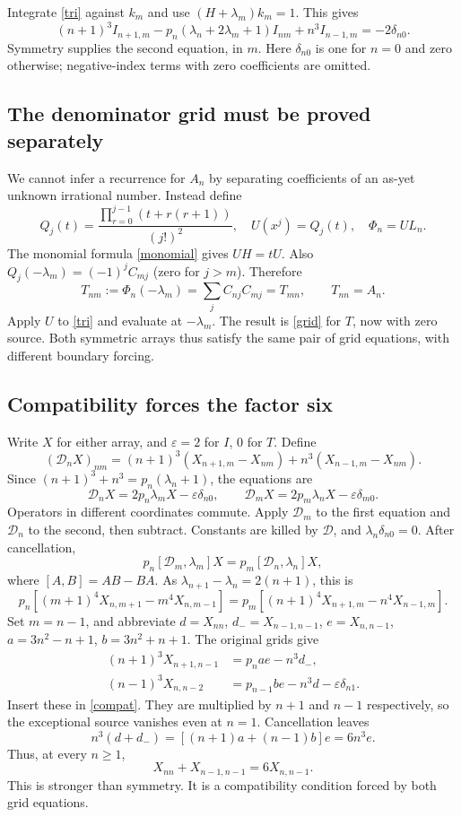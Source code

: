 \documentclass[11pt]{article}
\begin{document}
Integrate \eqref{tri} against $k_m$ and use $(H+\lambda_m)k_m=1$. This gives
\begin{equation}\label{grid}
 (n+1)^3I_{n+1,m}-p_n(\lambda_n+2\lambda_m+1)I_{nm}
       +n^3I_{n-1,m}=-2\delta_{n0}.
\end{equation}
Symmetry supplies the second equation, in $m$. Here $\delta_{n0}$ is one for $n=0$ and zero otherwise; negative-index terms with zero coefficients are omitted.

\subsection{The denominator grid must be proved separately}
We cannot infer a recurrence for $A_n$ by separating coefficients of an as-yet unknown irrational number. Instead define
\[
 Q_j(t)=\frac{\prod_{r=0}^{j-1}(t+r(r+1))}{(j!)^2},\quad
 U(x^j)=Q_j(t),\quad \Phi_n=UL_n.
\]
The monomial formula \eqref{monomial} gives $UH=tU$. Also
$Q_j(-\lambda_m)=(-1)^jC_{mj}$ (zero for $j>m$). Therefore
\[
 T_{nm}:=\Phi_n(-\lambda_m)=\sum_jC_{nj}C_{mj}=T_{mn},\qquad T_{nn}=A_n.
\]
Apply $U$ to \eqref{tri} and evaluate at $-\lambda_m$. The result is \eqref{grid} for $T$, now with zero source. Both symmetric arrays thus satisfy the same pair of grid equations, with different boundary forcing.

\subsection{Compatibility forces the factor six}
Write $X$ for either array, and $\varepsilon=2$ for $I$, $0$ for $T$. Define
\[
 (\mathcal D_nX)_{nm}=(n+1)^3(X_{n+1,m}-X_{nm})
                   +n^3(X_{n-1,m}-X_{nm}).
\]
Since $(n+1)^3+n^3=p_n(\lambda_n+1)$, the equations are
\[
 \mathcal D_nX=2p_n\lambda_mX-\varepsilon\delta_{n0},\qquad
 \mathcal D_mX=2p_m\lambda_nX-\varepsilon\delta_{m0}.
\]
Operators in different coordinates commute. Apply $\mathcal D_m$ to the first equation and $\mathcal D_n$ to the second, then subtract. Constants are killed by $\mathcal D$, and $\lambda_n\delta_{n0}=0$. After cancellation,
\[
 p_n[\mathcal D_m,\lambda_m]X=p_m[\mathcal D_n,\lambda_n]X,
\]
where $[A,B]=AB-BA$. As $\lambda_{n+1}-\lambda_n=2(n+1)$, this is
\begin{equation}\label{compat}
 p_n[(m+1)^4X_{n,m+1}-m^4X_{n,m-1}]
 =p_m[(n+1)^4X_{n+1,m}-n^4X_{n-1,m}].
\end{equation}
Set $m=n-1$, and abbreviate $d=X_{nn}$, $d_-=X_{n-1,n-1}$, $e=X_{n,n-1}$, $a=3n^2-n+1$, $b=3n^2+n+1$. The original grids give
\begin{align*}
 (n+1)^3X_{n+1,n-1}&=p_n a e-n^3d_-,\\
 (n-1)^3X_{n,n-2}&=p_{n-1}b e-n^3d-\varepsilon\delta_{n1}.
\end{align*}
Insert these in \eqref{compat}. They are multiplied by $n+1$ and $n-1$ respectively, so the exceptional source vanishes even at $n=1$. Cancellation leaves
\[
 n^3(d+d_-)=[(n+1)a+(n-1)b]e=6n^3e.
\]
Thus, at every $n\ge1$,
\begin{equation}\label{six}
 \boxed{X_{nn}+X_{n-1,n-1}=6X_{n,n-1}.}
\end{equation}
This is stronger than symmetry. It is a compatibility condition forced by both grid equations.
\end{document}
